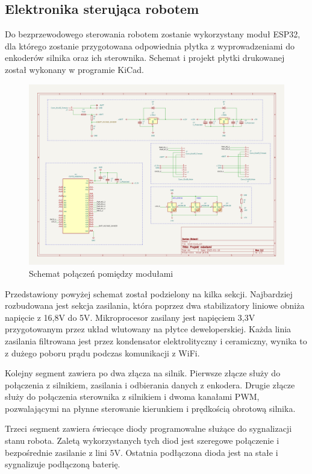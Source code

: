 \subsection{Elektronika sterująca robotem}
Do bezprzewodowego sterowania robotem zostanie wykorzystany moduł ESP32, dla którego zostanie przygotowana odpowiednia płytka 
z wyprowadzeniami do enkoderów silnika oraz ich sterownika. Schemat i projekt płytki drukowanej został wykonany w programie KiCad. 
\begin{figure}[H]
	\centering
	\includegraphics[width=18cm]{pages/robot/zdjecia/kicad/schematCaly.png}
	\caption{Schemat połączeń pomiędzy modułami}
	\label{Fig:schematKiCad}
\end{figure}

Przedstawiony powyżej schemat został podzielony na kilka sekcji. 
Najbardziej rozbudowana jest sekcja zasilania, która poprzez dwa stabilizatory liniowe obniża napięcie z 16,8V do 5V. Mikroprocesor zasilany jest
napięciem 3,3V przygotowanym przez układ wlutowany na płytce deweloperskiej. Każda linia zasilania filtrowana jest przez kondensator elektrolityczny 
i ceramiczny, wynika to z dużego poboru prądu podczas komunikacji z WiFi. 

Kolejny segment zawiera po dwa złącza na silnik. Pierwsze złącze służy do połączenia z silnikiem, zasilania i odbierania danych z enkodera.
Drugie złącze służy do połączenia sterownika z silnikiem i dwoma kanałami PWM, pozwalającymi na płynne sterowanie kierunkiem i prędkością obrotową silnika.

Trzeci segment zawiera świecące diody programowalne służące do sygnalizacji stanu robota. Zaletą wykorzystanych tych diod jest szeregowe połączenie 
i bezpośrednie zasilanie z lini 5V. Ostatnia podłączona dioda jest na stałe i sygnalizuje podłączoną baterię.

